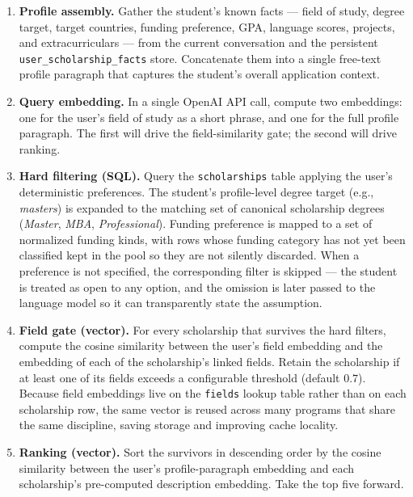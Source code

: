 \begin{enumerate}
    \item \textbf{Profile assembly.} Gather the student's known facts --- field of study, degree target, target countries, funding preference, GPA, language scores, projects, and extracurriculars --- from the current conversation and the persistent \texttt{user\_scholarship\_facts} store. Concatenate them into a single free-text profile paragraph that captures the student's overall application context.

    \item \textbf{Query embedding.} In a single OpenAI API call, compute two embeddings: one for the user's field of study as a short phrase, and one for the full profile paragraph. The first will drive the field-similarity gate; the second will drive ranking.

    \item \textbf{Hard filtering (SQL).} Query the \texttt{scholarships} table applying the user's deterministic preferences. The student's profile-level degree target (e.g., \textit{masters}) is expanded to the matching set of canonical scholarship degrees (\textit{Master}, \textit{MBA}, \textit{Professional}). Funding preference is mapped to a set of normalized funding kinds, with rows whose funding category has not yet been classified kept in the pool so they are not silently discarded. When a preference is not specified, the corresponding filter is skipped --- the student is treated as open to any option, and the omission is later passed to the language model so it can transparently state the assumption.

    \item \textbf{Field gate (vector).} For every scholarship that survives the hard filters, compute the cosine similarity between the user's field embedding and the embedding of each of the scholarship's linked fields. Retain the scholarship if at least one of its fields exceeds a configurable threshold (default $0.7$). Because field embeddings live on the \texttt{fields} lookup table rather than on each scholarship row, the same vector is reused across many programs that share the same discipline, saving storage and improving cache locality.

    \item \textbf{Ranking (vector).} Sort the survivors in descending order by the cosine similarity between the user's profile-paragraph embedding and each scholarship's pre-computed description embedding. Take the top five forward.


\end{enumerate}
